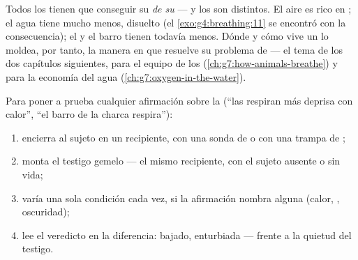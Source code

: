 \begin{proposition}\label{prop:g7:what-is-respiration:habitats}
Todos los  tienen que conseguir su  \emph{de su
} --- y los  son distintos. El aire es rico en ;
el agua tiene mucho menos, disuelto (el \cref{exo:g4:breathing:11} se
encontró con la consecuencia); el  y el barro tienen todavía
menos. Dónde y cómo vive un  lo moldea, por tanto, la manera en
que resuelve su problema de  --- el tema de los dos capítulos
siguientes, para el equipo de los 
(\cref{ch:g7:how-animals-breathe}) y para la economía del agua
(\cref{ch:g7:oxygen-in-the-water}).
\end{proposition}
\admitted

\begin{method}\label{met:g7:what-is-respiration:test}
Para poner a prueba cualquier afirmación sobre la  (``las
 respiran más deprisa con calor'', ``el barro de la charca
respira''):
\begin{enumerate}
  \item encierra al sujeto en un recipiente, con una sonda de  o
        con una trampa de ;
  \item monta el testigo gemelo --- el mismo recipiente, con el sujeto
        ausente o sin vida;
  \item varía una sola condición cada vez, si la afirmación nombra
        alguna (calor, , oscuridad);
  \item lee el veredicto en la diferencia:  bajado, 
        enturbiada --- frente a la quietud del testigo.
\end{enumerate}
\end{method}


